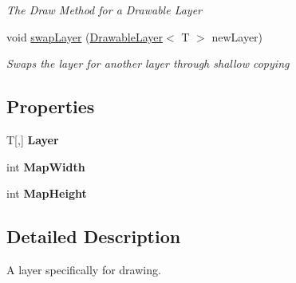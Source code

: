 \begin{DoxyCompactItemize}
\begin{DoxyCompactList}\small\item\em The Draw Method for a Drawable Layer \end{DoxyCompactList}\item 
void \hyperlink{class_tile_engine_1_1_drawable_layer_3_01_t_01_4_a6affc21c4de1bd7e35b7790a1ce7bfea}{swap\-Layer} (\hyperlink{class_tile_engine_1_1_drawable_layer_3_01_t_01_4_a75c68a1120810d78da78deb7e1842d6d}{Drawable\-Layer}$<$ T $>$ new\-Layer)
\begin{DoxyCompactList}\small\item\em Swaps the layer for another layer through shallow copying \end{DoxyCompactList}\end{DoxyCompactItemize}
\subsection*{Properties}
\begin{DoxyCompactItemize}
\item 
\hypertarget{class_tile_engine_1_1_drawable_layer_3_01_t_01_4_aa04b0945dfae8242798a620ab7fb73ec}{T\mbox{[},\mbox{]} {\bfseries Layer}}\label{d5/d15/class_tile_engine_1_1_drawable_layer_3_01_t_01_4_aa04b0945dfae8242798a620ab7fb73ec}

\item 
\hypertarget{class_tile_engine_1_1_drawable_layer_3_01_t_01_4_a61f8c541810f2a3d4e0adfb6ccab9045}{int {\bfseries Map\-Width}}\label{d5/d15/class_tile_engine_1_1_drawable_layer_3_01_t_01_4_a61f8c541810f2a3d4e0adfb6ccab9045}

\item 
\hypertarget{class_tile_engine_1_1_drawable_layer_3_01_t_01_4_ac92a235c150d1dd69bff8154a4f4f12e}{int {\bfseries Map\-Height}}\label{d5/d15/class_tile_engine_1_1_drawable_layer_3_01_t_01_4_ac92a235c150d1dd69bff8154a4f4f12e}

\end{DoxyCompactItemize}


\subsection{Detailed Description}
A layer specifically for drawing. 


